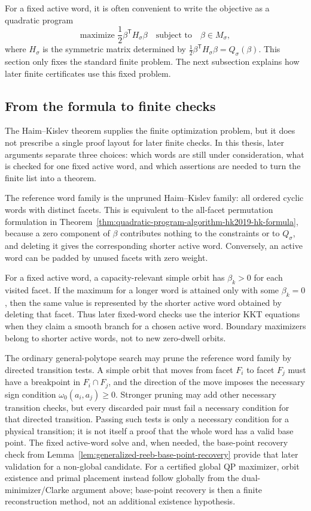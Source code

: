For a fixed active word, it is often convenient to write the objective as a
quadratic program
\[
  \text{maximize }\frac{1}{2}\beta^{\mathsf T}H_\sigma\beta
  \quad\text{subject to}\quad
  \beta\in M_\sigma,
\]
where \(H_\sigma\) is the symmetric matrix determined by
\(\frac{1}{2}\beta^{\mathsf T}H_\sigma\beta=Q_\sigma(\beta)\). This section
only fixes the standard finite problem. The next subsection explains how later
finite certificates use this fixed problem.

\subsection{From the formula to finite checks}
\label{subsec:quadratic-program-algorithm-hk2019-computation-layers}

The Haim--Kislev theorem supplies the finite optimization problem, but it does
not prescribe a single proof layout for later finite checks. In this thesis,
later arguments separate three choices: which words are still under
consideration, what is checked for one fixed active word, and which
assertions are needed to turn the finite list into a theorem.

The reference word family is the unpruned Haim--Kislev family: all ordered
cyclic words with distinct facets. This is equivalent to the all-facet
permutation formulation in Theorem~\ref{thm:quadratic-program-algorithm-hk2019-hk-formula},
because a zero component of \(\beta\) contributes nothing to the constraints or
to \(Q_\sigma\), and deleting it gives the corresponding shorter active word.
Conversely, an active word can be padded by unused facets with zero weight.

For a fixed active word, a capacity-relevant simple orbit has \(\beta_k>0\) for
each visited facet. If the maximum for a longer word is attained only with some
\(\beta_k=0\), then the same value is represented by the shorter active word
obtained by deleting that facet. Thus later fixed-word checks use the interior
KKT equations when they claim a smooth branch for a chosen active word.
Boundary maximizers belong to shorter active words, not to new zero-dwell
orbits.

The ordinary general-polytope search may prune the reference word family by
directed transition tests. A simple orbit that moves from facet \(F_i\) to
facet \(F_j\) must have a breakpoint in \(F_i\cap F_j\), and the direction of
the move imposes the necessary sign condition
\(\omega_0(a_i,a_j)\geq0\). Stronger pruning may add other necessary transition
checks, but every discarded pair must fail a necessary condition for that
directed transition. Passing such tests is only a necessary condition for a
physical transition; it is not itself a proof that the whole word has a valid
base point. The fixed active-word solve and, when needed, the base-point
recovery check from Lemma~\ref{lem:generalized-reeb-base-point-recovery}
provide that later validation for a non-global candidate.  For a certified
global QP maximizer, orbit existence and primal placement instead follow
globally from the dual-minimizer/Clarke argument above; base-point recovery is
then a finite reconstruction method, not an additional existence hypothesis.

